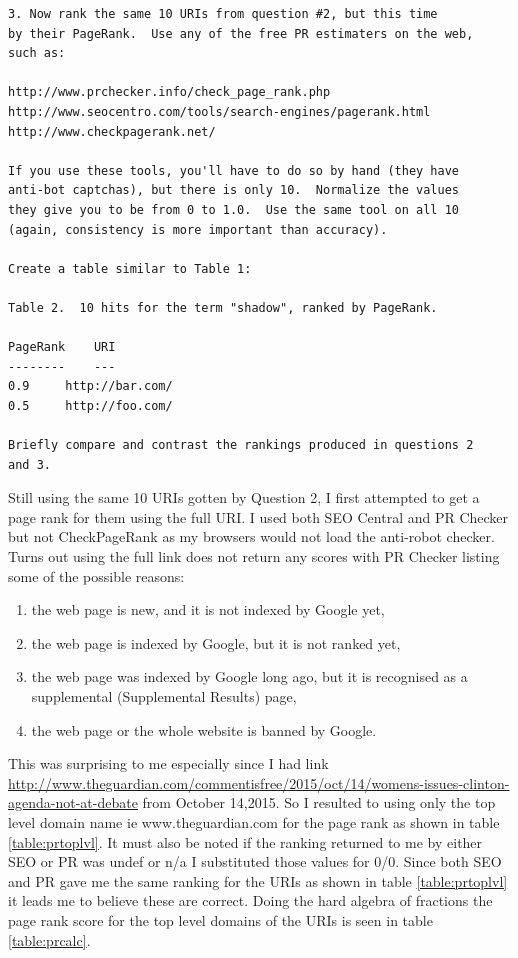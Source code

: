 \documentclass[letterpaper,10pt]{article}
\begin{document}
\begin{verbatim}
3. Now rank the same 10 URIs from question #2, but this time 
by their PageRank.  Use any of the free PR estimaters on the web,
such as:

http://www.prchecker.info/check_page_rank.php
http://www.seocentro.com/tools/search-engines/pagerank.html
http://www.checkpagerank.net/

If you use these tools, you'll have to do so by hand (they have
anti-bot captchas), but there is only 10.  Normalize the values
they give you to be from 0 to 1.0.  Use the same tool on all 10
(again, consistency is more important than accuracy).

Create a table similar to Table 1:

Table 2.  10 hits for the term "shadow", ranked by PageRank.

PageRank	URI
--------	---
0.9		http://bar.com/
0.5		http://foo.com/

Briefly compare and contrast the rankings produced in questions 2
and 3.
\end{verbatim}

Still using the same 10 URIs gotten by Question 2, I first attempted to get a page rank for them using the full URI. I used both SEO Central and PR Checker but not  CheckPageRank as my browsers would not load the anti-robot checker. Turns out using the full link does not return any scores with PR Checker listing some of the possible reasons: 
\begin{enumerate}
\item the web page is new, and it is not indexed by Google yet,
\item the web page is indexed by Google, but it is not ranked yet,
\item the web page was indexed by Google long ago, but it is recognised
     as a supplemental (Supplemental Results) page,
\item the web page or the whole website is banned by Google.
\end{enumerate}

This was surprising to me especially since I had link \url{http://www.theguardian.com/commentisfree/2015/oct/14/womens-issues-clinton-agenda-not-at-debate} from October 14,2015. So I resulted to using only the top level domain name ie www.theguardian.com for the page rank as shown in table \ref{table:prtoplvl}. 
\newline
It must also be noted if the ranking returned to me by either SEO or PR was undef or n/a I substituted those values for 0/0. Since both SEO and PR gave me the same ranking for the URIs as shown in table \ref{table:prtoplvl} it leads me to believe these are correct.  Doing the hard algebra of fractions the page rank score for the top level domains of the URIs is seen in table \ref{table:prcalc}.
\newline
\end{document}

